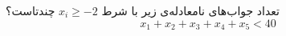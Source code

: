 \EXERCISE
تعداد جواب‌های نامعادله‌ی زیر با شرط
$x_i \geq -2$
چندتاست؟
$$x_1 + x_2 + x_3 + x_4 + x_5 < 40$$